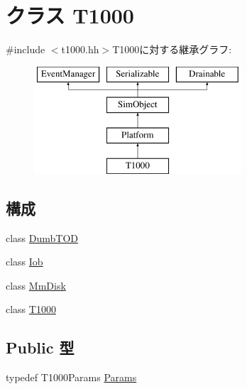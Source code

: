 \hypertarget{classT1000}{
\section{クラス T1000}
\label{classT1000}
}


{\ttfamily \#include $<$t1000.hh$>$}T1000に対する継承グラフ:\begin{figure}[H]
\begin{center}
\leavevmode
\includegraphics[height=4cm]{classT1000}
\end{center}
\end{figure}
\subsection*{構成}
\begin{DoxyCompactItemize}
\item 
class \hyperlink{classT1000_1_1DumbTOD}{DumbTOD}
\item 
class \hyperlink{classT1000_1_1Iob}{Iob}
\item 
class \hyperlink{classT1000_1_1MmDisk}{MmDisk}
\item 
class \hyperlink{classT1000_1_1T1000}{T1000}
\end{DoxyCompactItemize}
\subsection*{Public 型}
\begin{DoxyCompactItemize}
\item 
typedef T1000Params \hyperlink{classT1000_abc8ac05350758af915732ecded3a736e}{Params}
\end{DoxyCompactItemize}
